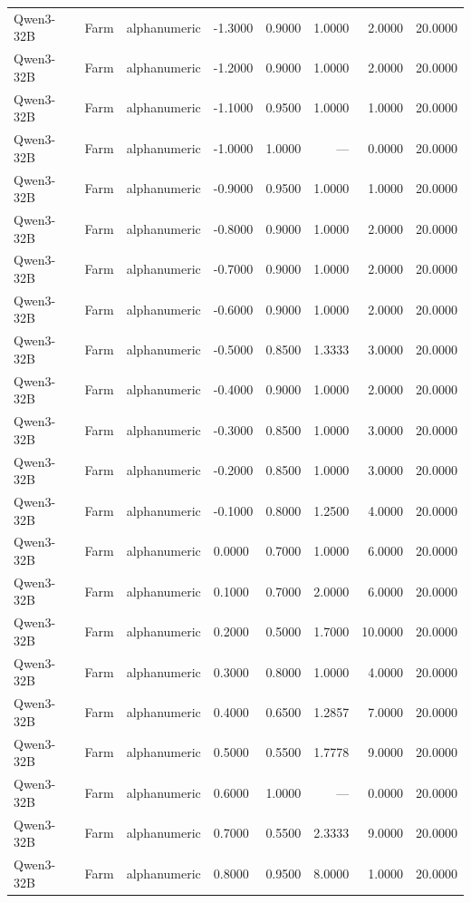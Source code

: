 \begin{table}
\begin{tabular}{llllrrrr}
Qwen3-32B & Farm & alphanumeric & -1.3000 & 0.9000 & 1.0000 & 2.0000 & 20.0000 \\
Qwen3-32B & Farm & alphanumeric & -1.2000 & 0.9000 & 1.0000 & 2.0000 & 20.0000 \\
Qwen3-32B & Farm & alphanumeric & -1.1000 & 0.9500 & 1.0000 & 1.0000 & 20.0000 \\
Qwen3-32B & Farm & alphanumeric & -1.0000 & 1.0000 & --- & 0.0000 & 20.0000 \\
Qwen3-32B & Farm & alphanumeric & -0.9000 & 0.9500 & 1.0000 & 1.0000 & 20.0000 \\
Qwen3-32B & Farm & alphanumeric & -0.8000 & 0.9000 & 1.0000 & 2.0000 & 20.0000 \\
Qwen3-32B & Farm & alphanumeric & -0.7000 & 0.9000 & 1.0000 & 2.0000 & 20.0000 \\
Qwen3-32B & Farm & alphanumeric & -0.6000 & 0.9000 & 1.0000 & 2.0000 & 20.0000 \\
Qwen3-32B & Farm & alphanumeric & -0.5000 & 0.8500 & 1.3333 & 3.0000 & 20.0000 \\
Qwen3-32B & Farm & alphanumeric & -0.4000 & 0.9000 & 1.0000 & 2.0000 & 20.0000 \\
Qwen3-32B & Farm & alphanumeric & -0.3000 & 0.8500 & 1.0000 & 3.0000 & 20.0000 \\
Qwen3-32B & Farm & alphanumeric & -0.2000 & 0.8500 & 1.0000 & 3.0000 & 20.0000 \\
Qwen3-32B & Farm & alphanumeric & -0.1000 & 0.8000 & 1.2500 & 4.0000 & 20.0000 \\
Qwen3-32B & Farm & alphanumeric & 0.0000 & 0.7000 & 1.0000 & 6.0000 & 20.0000 \\
Qwen3-32B & Farm & alphanumeric & 0.1000 & 0.7000 & 2.0000 & 6.0000 & 20.0000 \\
Qwen3-32B & Farm & alphanumeric & 0.2000 & 0.5000 & 1.7000 & 10.0000 & 20.0000 \\
Qwen3-32B & Farm & alphanumeric & 0.3000 & 0.8000 & 1.0000 & 4.0000 & 20.0000 \\
Qwen3-32B & Farm & alphanumeric & 0.4000 & 0.6500 & 1.2857 & 7.0000 & 20.0000 \\
Qwen3-32B & Farm & alphanumeric & 0.5000 & 0.5500 & 1.7778 & 9.0000 & 20.0000 \\
Qwen3-32B & Farm & alphanumeric & 0.6000 & 1.0000 & --- & 0.0000 & 20.0000 \\
Qwen3-32B & Farm & alphanumeric & 0.7000 & 0.5500 & 2.3333 & 9.0000 & 20.0000 \\
Qwen3-32B & Farm & alphanumeric & 0.8000 & 0.9500 & 8.0000 & 1.0000 & 20.0000 \\

\end{tabular}
\end{table}
